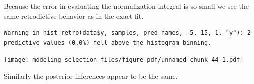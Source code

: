 \documentclass[
  letterpaper,
  DIV=11,
  numbers=noendperiod]{scrartcl}
\newenvironment{Shaded}{\begin{snugshade}}{\end{snugshade}}
\newcommand{\AttributeTok}[1]{\textcolor[rgb]{0.40,0.45,0.13}{#1}}
\newcommand{\ConstantTok}[1]{\textcolor[rgb]{0.56,0.35,0.01}{#1}}
\newcommand{\DecValTok}[1]{\textcolor[rgb]{0.68,0.00,0.00}{#1}}
\newcommand{\FunctionTok}[1]{\textcolor[rgb]{0.28,0.35,0.67}{#1}}
\newcommand{\NormalTok}[1]{\textcolor[rgb]{0.00,0.23,0.31}{#1}}
\newcommand{\OtherTok}[1]{\textcolor[rgb]{0.00,0.23,0.31}{#1}}
\newcommand{\SpecialCharTok}[1]{\textcolor[rgb]{0.37,0.37,0.37}{#1}}
\newcommand{\StringTok}[1]{\textcolor[rgb]{0.13,0.47,0.30}{#1}}
\begin{document}
Because the error in evaluating the normalization integral is so small
we see the same retrodictive behavior as in the exact fit.

\begin{Shaded}
\end{Shaded}

\begin{verbatim}
Warning in hist_retro(data$y, samples, pred_names, -5, 15, 1, "y"): 2
predictive values (0.0%) fell above the histogram binning.
\end{verbatim}

\texttt{[image: modeling\_selection\_files/figure-pdf/unnamed-chunk-44-1.pdf]}

Similarly the posterior inferences appear to be the same.
\end{document}
